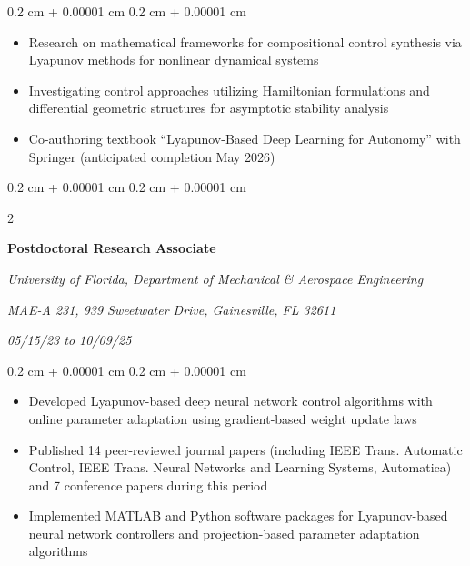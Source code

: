 \documentclass[10pt, letterpaper]{article}
\newenvironment{highlights}{
    \begin{itemize}[
        topsep=0.10 cm,
        parsep=0.10 cm,
        partopsep=0pt,
        itemsep=0pt,
        leftmargin=0.4 cm + 10pt
    ]
}{
    \end{itemize}
} %
\newenvironment{onecolentry}{
    \begin{adjustwidth}{
        0.2 cm + 0.00001 cm
    }{
        0.2 cm + 0.00001 cm
    }
}{
    \end{adjustwidth}
} %
\newenvironment{twocolentry}[2][]{
    \onecolentry
    \def\secondColumn{#2}
    \setcolumnwidth{\fill, 4.5 cm}
    \begin{paracol}{2}
}{
    \switchcolumn \raggedleft \secondColumn
    \end{paracol}
    \endonecolentry
} %
\begin{document}
        \vspace{0.05 cm}
        \begin{onecolentry}
            \begin{highlights}
                \setlength{\itemsep}{0pt}
                \item Research on mathematical frameworks for compositional control synthesis via Lyapunov methods for nonlinear dynamical systems
                \item Investigating control approaches utilizing Hamiltonian formulations and differential geometric structures for asymptotic stability analysis
                \item Co-authoring textbook ``Lyapunov-Based Deep Learning for Autonomy'' with Springer (anticipated completion May 2026)
            \end{highlights}
        \end{onecolentry}


        \vspace{0.05 cm}

        \begin{twocolentry}{
            
            
        \textit{05/15/23 to 10/09/25}}
            \textbf{Postdoctoral Research Associate}
            
            \textit{University of Florida, Department of Mechanical \& Aerospace Engineering}
            
            \textit{MAE-A 231, 939 Sweetwater Drive, Gainesville, FL 32611}
        \end{twocolentry}

        \vspace{0.05 cm}
        \begin{onecolentry}
            \begin{highlights}
                \setlength{\itemsep}{0pt}
                \item Developed Lyapunov-based deep neural network control algorithms with online parameter adaptation using gradient-based weight update laws
                \item Published 14 peer-reviewed journal papers (including IEEE Trans. Automatic Control, IEEE Trans. Neural Networks and Learning Systems, Automatica) and 7 conference papers during this period
                \item Implemented MATLAB and Python software packages for Lyapunov-based neural network controllers and projection-based parameter adaptation algorithms
            \end{highlights}
        \end{onecolentry}
\end{document}
